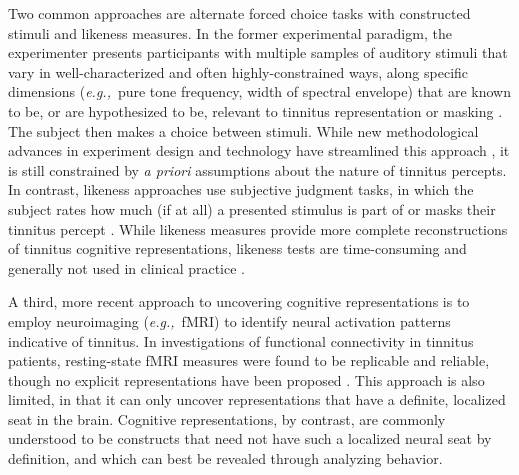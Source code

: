 \documentclass[11pt, notitlepage]{article} %
\def\eg{{\emph{e.g.,}}~}
\begin{document}
Two common approaches are alternate forced choice tasks with constructed stimuli
and likeness measures.
In the former experimental paradigm,
the experimenter presents participants with multiple samples of auditory stimuli that vary in well-characterized
and often highly-constrained ways, along specific dimensions (\eg pure tone frequency, width of spectral envelope)
that are known to be, or are hypothesized to be, relevant to tinnitus representation or masking
\cite{vajsakovicPrinciplesMethodsPsychoacoustic2021,henryMeasurementTinnitus2016}.
The subject then makes a choice between stimuli.
While new methodological advances in experiment design and technology have streamlined this approach
\cite{korthOneStepCloser2020,henryComputerautomatedTinnitusAssessment2004,henryComputerautomatedTinnitusAssessment2013},
it is still constrained by \emph{a priori} assumptions about the nature of tinnitus percepts.
In contrast, likeness approaches use subjective judgment tasks,
in which the subject rates how much (if at all) a presented stimulus is part of or masks their tinnitus percept
\cite{norenaPsychoacousticCharacterizationTinnitus2002}.
While likeness measures provide more complete reconstructions of tinnitus cognitive representations,
likeness tests are time-consuming and generally not used in clinical practice
\cite{vajsakovicPrinciplesMethodsPsychoacoustic2021}.

A third, more recent approach to uncovering cognitive representations is to employ neuroimaging
(\eg fMRI) to identify neural activation patterns indicative of tinnitus.
In investigations of functional connectivity in tinnitus patients,
resting-state fMRI measures were found to be replicable and reliable,
though no explicit representations have been proposed
\cite{husainReplicabilityNeuralBehavioral2019}.
This approach is also
limited, in that it can only uncover representations that have a definite, localized seat in the brain.
Cognitive representations, by contrast, are commonly understood to be constructs that need not have
such a localized neural seat by definition, and which can best be revealed through analyzing behavior.
\end{document}
